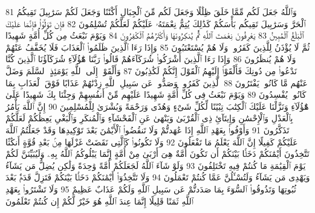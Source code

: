 {\tiny\colorbox{cl_aya}{81}} وَٱللَّهُ جَعَلَ لَكُم مِّمَّا خَلَقَ ظِلَٰلًا وَجَعَلَ لَكُم مِّنَ ٱلْجِبَالِ أَكْنَٰنًا وَجَعَلَ لَكُمْ سَرَٰبِيلَ تَقِيكُمُ ٱلْحَرَّ وَسَرَٰبِيلَ تَقِيكُم بَأْسَكُمْ كَذَٰلِكَ يُتِمُّ نِعْمَتَهُۥ عَلَيْكُمْ لَعَلَّكُمْ تُسْلِمُونَ
{\tiny\colorbox{cl_aya}{82}} فَإِن تَوَلَّوْا۟ فَإِنَّمَا عَلَيْكَ ٱلْبَلَٰغُ ٱلْمُبِينُ
{\tiny\colorbox{cl_aya}{83}} يَعْرِفُونَ نِعْمَتَ ٱللَّهِ ثُمَّ يُنكِرُونَهَا وَأَكْثَرُهُمُ ٱلْكَٰفِرُونَ
{\tiny\colorbox{cl_aya}{84}} وَيَوْمَ نَبْعَثُ مِن كُلِّ أُمَّةٍ شَهِيدًا ثُمَّ لَا يُؤْذَنُ لِلَّذِينَ كَفَرُوا۟ وَلَا هُمْ يُسْتَعْتَبُونَ
{\tiny\colorbox{cl_aya}{85}} وَإِذَا رَءَا ٱلَّذِينَ ظَلَمُوا۟ ٱلْعَذَابَ فَلَا يُخَفَّفُ عَنْهُمْ وَلَا هُمْ يُنظَرُونَ
{\tiny\colorbox{cl_aya}{86}} وَإِذَا رَءَا ٱلَّذِينَ أَشْرَكُوا۟ شُرَكَآءَهُمْ قَالُوا۟ رَبَّنَا هَٰٓؤُلَآءِ شُرَكَآؤُنَا ٱلَّذِينَ كُنَّا نَدْعُوا۟ مِن دُونِكَ فَأَلْقَوْا۟ إِلَيْهِمُ ٱلْقَوْلَ إِنَّكُمْ لَكَٰذِبُونَ
{\tiny\colorbox{cl_aya}{87}} وَأَلْقَوْا۟ إِلَى ٱللَّهِ يَوْمَئِذٍ ٱلسَّلَمَ وَضَلَّ عَنْهُم مَّا كَانُوا۟ يَفْتَرُونَ
{\tiny\colorbox{cl_aya}{88}} ٱلَّذِينَ كَفَرُوا۟ وَصَدُّوا۟ عَن سَبِيلِ ٱللَّهِ زِدْنَٰهُمْ عَذَابًا فَوْقَ ٱلْعَذَابِ بِمَا كَانُوا۟ يُفْسِدُونَ
{\tiny\colorbox{cl_aya}{89}} وَيَوْمَ نَبْعَثُ فِى كُلِّ أُمَّةٍ شَهِيدًا عَلَيْهِم مِّنْ أَنفُسِهِمْ وَجِئْنَا بِكَ شَهِيدًا عَلَىٰ هَٰٓؤُلَآءِ وَنَزَّلْنَا عَلَيْكَ ٱلْكِتَٰبَ تِبْيَٰنًا لِّكُلِّ شَىْءٍ وَهُدًى وَرَحْمَةً وَبُشْرَىٰ لِلْمُسْلِمِينَ
{\tiny\colorbox{cl_aya}{90}} إِنَّ ٱللَّهَ يَأْمُرُ بِٱلْعَدْلِ وَٱلْإِحْسَٰنِ وَإِيتَآئِ ذِى ٱلْقُرْبَىٰ وَيَنْهَىٰ عَنِ ٱلْفَحْشَآءِ وَٱلْمُنكَرِ وَٱلْبَغْىِ يَعِظُكُمْ لَعَلَّكُمْ تَذَكَّرُونَ
{\tiny\colorbox{cl_aya}{91}} وَأَوْفُوا۟ بِعَهْدِ ٱللَّهِ إِذَا عَٰهَدتُّمْ وَلَا تَنقُضُوا۟ ٱلْأَيْمَٰنَ بَعْدَ تَوْكِيدِهَا وَقَدْ جَعَلْتُمُ ٱللَّهَ عَلَيْكُمْ كَفِيلًا إِنَّ ٱللَّهَ يَعْلَمُ مَا تَفْعَلُونَ
{\tiny\colorbox{cl_aya}{92}} وَلَا تَكُونُوا۟ كَٱلَّتِى نَقَضَتْ غَزْلَهَا مِنۢ بَعْدِ قُوَّةٍ أَنكَٰثًا تَتَّخِذُونَ أَيْمَٰنَكُمْ دَخَلًۢا بَيْنَكُمْ أَن تَكُونَ أُمَّةٌ هِىَ أَرْبَىٰ مِنْ أُمَّةٍ إِنَّمَا يَبْلُوكُمُ ٱللَّهُ بِهِۦ وَلَيُبَيِّنَنَّ لَكُمْ يَوْمَ ٱلْقِيَٰمَةِ مَا كُنتُمْ فِيهِ تَخْتَلِفُونَ
{\tiny\colorbox{cl_aya}{93}} وَلَوْ شَآءَ ٱللَّهُ لَجَعَلَكُمْ أُمَّةً وَٰحِدَةً وَلَٰكِن يُضِلُّ مَن يَشَآءُ وَيَهْدِى مَن يَشَآءُ وَلَتُسْـَٔلُنَّ عَمَّا كُنتُمْ تَعْمَلُونَ
{\tiny\colorbox{cl_aya}{94}} وَلَا تَتَّخِذُوٓا۟ أَيْمَٰنَكُمْ دَخَلًۢا بَيْنَكُمْ فَتَزِلَّ قَدَمٌۢ بَعْدَ ثُبُوتِهَا وَتَذُوقُوا۟ ٱلسُّوٓءَ بِمَا صَدَدتُّمْ عَن سَبِيلِ ٱللَّهِ وَلَكُمْ عَذَابٌ عَظِيمٌ
{\tiny\colorbox{cl_aya}{95}} وَلَا تَشْتَرُوا۟ بِعَهْدِ ٱللَّهِ ثَمَنًا قَلِيلًا إِنَّمَا عِندَ ٱللَّهِ هُوَ خَيْرٌ لَّكُمْ إِن كُنتُمْ تَعْلَمُونَ
